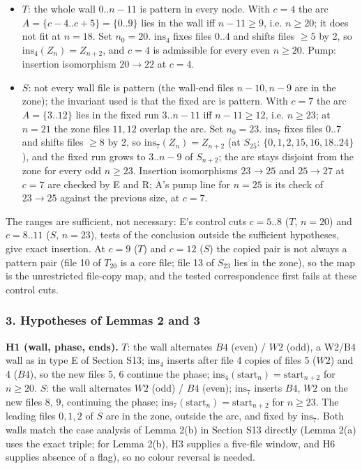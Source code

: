 \begin{itemize}
\item $T$: the whole wall $0..n-11$ is pattern in every node. With $c=4$ the arc $A=\{c-4..c+5\}=\{0..9\}$ lies in the wall iff $n-11\ge9$, i.e. $n\ge20$; it does not fit at $n=18$. Set $n_0=20$. $\mathrm{ins}_4$ fixes files $0..4$ and shifts files $\ge5$ by 2, so $\mathrm{ins}_4(Z_n)=Z_{n+2}$, and $c=4$ is admissible for every even $n\ge20$. Pump: insertion isomorphism $20\to22$ at $c=4$.
\item $S$: not every wall file is pattern (the wall-end files $n-10,n-9$ are in the zone); the invariant used is that the fixed arc is pattern. With $c=7$ the arc $A=\{3..12\}$ lies in the fixed run $3..n-11$ iff $n-11\ge12$, i.e. $n\ge23$; at $n=21$ the zone files $11,12$ overlap the arc. Set $n_0=23$. $\mathrm{ins}_7$ fixes files $0..7$ and shifts files $\ge8$ by 2, so $\mathrm{ins}_7(Z_n)=Z_{n+2}$ (at $S_{25}$: $\{0,1,2,15,16,18..24\}$), and the fixed run grows to $3..n-9$ of $S_{n+2}$; the arc stays disjoint from the zone for every odd $n\ge23$. Insertion isomorphisms $23\to25$ and $25\to27$ at $c=7$ are checked by E and R; A's pump line for $n=25$ is its check of $23\to25$ against the previous size, at $c=7$.
\end{itemize}
The ranges are sufficient, not necessary: E's control cuts $c=5..8$ ($T$, $n=20$) and $c=8..11$ ($S$, $n=23$), tests of the conclusion outside the sufficient hypotheses, give exact insertion. At $c=9$ ($T$) and $c=12$ ($S$) the copied pair is not always a pattern pair (file 10 of $T_{20}$ is a core file; file 13 of $S_{23}$ lies in the zone), so the map is the unrestricted file-copy map, and the tested correspondence first fails at these control cuts.

\subsubsection*{3. Hypotheses of Lemmas 2 and 3}
\textbf{H1 (wall, phase, ends).} $T$: the wall alternates $B4$ (even) / $W2$ (odd), a W2/B4 wall as in type E of Section S13; $\mathrm{ins}_4$ inserts after file 4 copies of files 5 ($W2$) and 4 ($B4$), so the new files 5, 6 continue the phase; $\mathrm{ins}_4(\mathrm{start}_n)=\mathrm{start}_{n+2}$ for $n\ge20$. $S$: the wall alternates $W2$ (odd) / $B4$ (even); $\mathrm{ins}_7$ inserts $B4$, $W2$ on the new files 8, 9, continuing the phase; $\mathrm{ins}_7(\mathrm{start}_n)=\mathrm{start}_{n+2}$ for $n\ge23$. The leading files $0,1,2$ of $S$ are in the zone, outside the arc, and fixed by $\mathrm{ins}_7$. Both walls match the case analysis of Lemma 2(b) in Section S13 directly (Lemma 2(a) uses the exact triple; for Lemma 2(b), H3 supplies a five-file window, and H6 supplies absence of a flag), so no colour reversal is needed.

